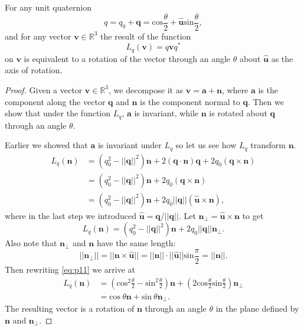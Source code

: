 \begin{theorem}
For any unit quaternion
\begin{equation}
q = q_0 + \textbf{q} = \mbox{cos}\frac{\theta}{2} + \mathbf{\hat{u}}\mbox{sin}\frac{\theta}{2},
\label{eq:unitquat}
\end{equation}
and for any vector $\textbf{v} \in \mathbb{R}^3$ the result of the function
\begin{equation*}
L_q(\textbf{v}) = q\textbf{v}q^*
\end{equation*}
on $\textbf{v}$ is equivalent to a rotation of the vector through an angle $\theta$ about $\mathbf{\hat{u}}$ as the axis of rotation.
\end{theorem}

\begin{proof}
Given a vector $\textbf{v} \in \mathbb{R}^3$, we decompose it as $\textbf{v} = \textbf{a} + \textbf{n}$, where $\textbf{a}$ is the component along the vector $\textbf{q}$ and $\textbf{n}$ is the component normal to $\textbf{q}$. 
Then we show that under the function $L_q$, $\textbf{a}$ is invariant, while $\textbf{n}$ is rotated about $\textbf{q}$ through an angle $\theta$. 

Earlier we showed that $\textbf{a}$ is invariant under $L_q$ so let us see how $L_q$ transform $\textbf{n}$.
\begin{align*}
L_q(\textbf{n}) &= (q_0^2 - ||\textbf{q}||^2)\textbf{n} + 2(\textbf{q} \cdot \textbf{n})\textbf{q} + 2q_0(\textbf{q} \times \textbf{n}) \\
&= (q_0^2 - ||\textbf{q}||^2)\textbf{n} + 2q_0(\textbf{q} \times \textbf{n}) \\
&= (q_0^2 - ||\textbf{q}||^2)\textbf{n} + 2q_0||\textbf{q}||(\mathbf{\hat{u}} \times \textbf{n}),
\end{align*}
where in the last step we introduced $\mathbf{\hat{u}} = \textbf{q}/||\textbf{q}||$.
Let $\textbf{n}_{\bot} = \mathbf{\hat{u}} \times \textbf{n}$ to get
\begin{equation}
L_q(\textbf{n}) = (q_0^2 -||\textbf{q}||^2)\textbf{n} + 2q_0||\textbf{q}||\textbf{n}_{\bot}.
\label{eq:p11}
\end{equation}
Also note that $\textbf{n}_{\bot}$ and $\textbf{n}$ have the same length:
\begin{equation*}
||\textbf{n}_{\bot}|| = ||\textbf{n} \times \mathbf{\hat{u}}|| = ||\textbf{n}|| \cdot ||\mathbf{\hat{u}}||\mbox{sin}\frac{\pi}{2} = ||\textbf{n}||.
\end{equation*}
Then rewriting \eqref{eq:p11} we arrive at
\begin{align*}
L_q(\textbf{n}) &= \left( \mbox{cos}^2 \frac{\theta}{2} - \mbox{sin}^2 \frac{\theta}{2} \right) \textbf{n} + \left( 2\mbox{cos} \frac{\theta}{2} \mbox{sin} \frac{\theta}{2} \right) \textbf{n}_{\bot} \\
&= \mbox{cos}~\theta \textbf{n} + \mbox{sin}~\theta \textbf{n}_{\bot}.
\end{align*}
The resulting vector is a rotation of $\textbf{n}$ through an angle $\theta$ in the plane defined by $\textbf{n}$ and $\textbf{n}_{\bot}$.
\end{proof}















